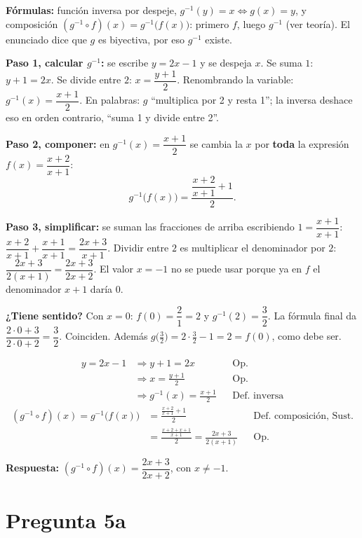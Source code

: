 \documentclass[11pt]{article}
\begin{document}
\begin{explica}
\textbf{Fórmulas:} función inversa por despeje, $g^{-1}(y)=x\iff g(x)=y$, y composición $(g^{-1}\circ f)(x)=g^{-1}\big(f(x)\big)$: primero $f$, luego $g^{-1}$ (ver teoría). El enunciado dice que $g$ es biyectiva, por eso $g^{-1}$ existe.

\textbf{Paso 1, calcular $g^{-1}$:} se escribe $y=2x-1$ y se despeja $x$. Se suma $1$: $y+1=2x$. Se divide entre $2$: $x=\dfrac{y+1}{2}$. Renombrando la variable: $g^{-1}(x)=\dfrac{x+1}{2}$. En palabras: $g$ ``multiplica por 2 y resta 1''; la inversa deshace eso en orden contrario, ``suma 1 y divide entre 2''.

\textbf{Paso 2, componer:} en $g^{-1}(x)=\dfrac{x+1}{2}$ se cambia la $x$ por \textbf{toda} la expresión $f(x)=\dfrac{x+2}{x+1}$:
\[ g^{-1}\big(f(x)\big)=\frac{\dfrac{x+2}{x+1}+1}{2}. \]

\textbf{Paso 3, simplificar:} se suman las fracciones de arriba escribiendo $1=\dfrac{x+1}{x+1}$: $\dfrac{x+2}{x+1}+\dfrac{x+1}{x+1}=\dfrac{2x+3}{x+1}$. Dividir entre $2$ es multiplicar el denominador por $2$: $\dfrac{2x+3}{2(x+1)}=\dfrac{2x+3}{2x+2}$. El valor $x=-1$ no se puede usar porque ya en $f$ el denominador $x+1$ daría $0$.

\textbf{¿Tiene sentido?} Con $x=0$: $f(0)=\dfrac{2}{1}=2$ y $g^{-1}(2)=\dfrac{3}{2}$. La fórmula final da $\dfrac{2\cdot0+3}{2\cdot0+2}=\dfrac32$. Coinciden. Además $g\big(\tfrac32\big)=2\cdot\tfrac32-1=2=f(0)$, como debe ser.
\end{explica}

\begin{align*}
y=2x-1 &\Rightarrow y+1=2x && \text{Op.}\\
&\Rightarrow x=\frac{y+1}{2} && \text{Op.}\\
&\Rightarrow g^{-1}(x)=\frac{x+1}{2} && \text{Def.\ inversa}
\end{align*}
\begin{align*}
(g^{-1}\circ f)(x)=g^{-1}\big(f(x)\big) &=\frac{\frac{x+2}{x+1}+1}{2} && \text{Def.\ composición, Sust.}\\
&=\frac{\frac{x+2+x+1}{x+1}}{2}=\frac{2x+3}{2(x+1)} && \text{Op.}
\end{align*}

\textbf{Respuesta:} $(g^{-1}\circ f)(x)=\dfrac{2x+3}{2x+2}$, con $x\neq-1$.

\clearpage
\section*{Pregunta 5a}
\end{document}
